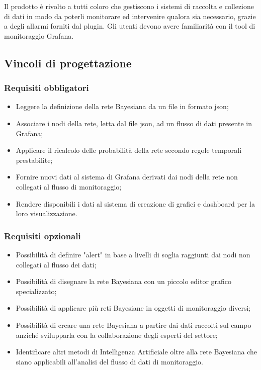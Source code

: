 Il prodotto è rivolto a tutti coloro che gestiscono i sistemi di raccolta e collezione di dati in modo da poterli monitorare ed intervenire qualora sia necessario, grazie a degli allarmi forniti dal plugin.
Gli utenti devono avere familiarità  con il tool di monitoraggio Grafana.


		\subsection{Vincoli di progettazione}
			\subsubsection{Requisiti obbligatori}
				\begin{itemize}
					\item Leggere la definizione della rete Bayesiana da un file in formato json;
					\item Associare i nodi della rete, letta dal file json, ad un flusso di dati presente in Grafana;
					\item Applicare il ricalcolo delle probabilità della rete secondo regole temporali prestabilite;
					\item Fornire nuovi dati al sistema di Grafana derivati dai nodi della rete non collegati al flusso di monitoraggio;
					\item Rendere disponibili i dati al sistema di creazione di grafici e dashboard per la loro visualizzazione.
		        	\end{itemize}
			\subsubsection{Requisiti opzionali}
				\begin{itemize}
					\item Possibilità di definire "alert\pedice" in base a livelli di soglia raggiunti dai nodi non collegati al flusso dei dati;
					\item Possibilità di disegnare la rete Bayesiana con un piccolo editor grafico specializzato;
					\item Possibilità di applicare più reti Bayesiane in oggetti di monitoraggio diversi;
					\item Possibilità di creare una rete Bayesiana a partire dai dati raccolti sul campo anziché svilupparla con la collaborazione degli esperti del settore;
					\item Identificare altri metodi di Intelligenza Artificiale oltre alla rete Bayesiana che siano applicabili all'analisi del flusso di dati di monitoraggio.
		        	\end{itemize}
